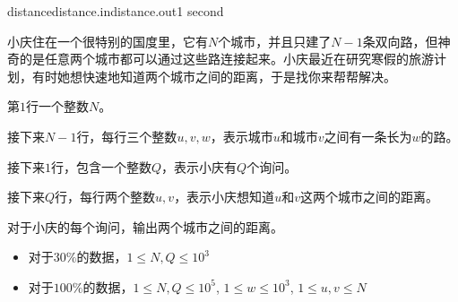\documentclass[11pt,a4paper,oneside]{article}
\begin{document}
\begin{problem}{distance}{distance.in}{distance.out}{1 second} 
		
		小庆住在一个很特别的国度里，它有$N$个城市，并且只建了$N-1$条双向路，但神奇的是任意两个城市都可以通过这些路连接起来。小庆最近在研究寒假的旅游计划，有时她想快速地知道两个城市之间的距离，于是找你来帮帮解决。
		
		\InputFile
		
		第$1$行一个整数$N$。	
		
		接下来$N-1$行，每行三个整数$u, v, w$，表示城市$u$和城市$v$之间有一条长为$w$的路。
		
		接下来$1$行，包含一个整数$Q$，表示小庆有$Q$个询问。
		
		接下来$Q$行，每行两个整数$u,v$，表示小庆想知道$u$和$v$这两个城市之间的距离。
		
		\OutputFile
		
		对于小庆的每个询问，输出两个城市之间的距离。
		
		\Example
		
		\begin{example}
	\end{example}
	
	\Note
	
	\begin{itemize}
		\item 对于$30\%$的数据，$1 \leq N, Q \leq 10^3$
		\item 对于$100\%$的数据，$1 \leq N, Q \leq 10^5$, $1 \leq w \leq 10^3$, $1 \leq u, v \leq N$ 
	\end{itemize}
	
\end{problem}
\end{document}
